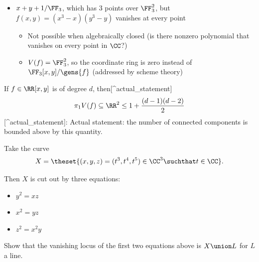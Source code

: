 \begin{example}
\begin{itemize}
\item
  \(x+y+1/\FF_3\), which has 3 points over \(\FF_3^2\), but
  \(f(x, y) = (x^3 - x)(y^3-y)\) vanishes at every point

  \begin{itemize}
  \item
    Not possible when algebraically closed (is there nonzero polynomial
    that vanishes on every point in \(\CC\)?)
  \item
    \(V(f) = \FF_3^2\), so the coordinate ring is zero instead of
    \(\FF_3[x, y]/\gens{f}\) (addressed by scheme theory)
  \end{itemize}
\end{itemize}

\end{example}

\begin{theorem}

If \(f \in \RR[x, y]\) is of degree \(d\),
then{[}\^{}actual\_statement{]}
\begin{align*}  
\pi_1 V(f) \subseteq \RR^2 \leq 1 + {(d-1)(d-2) \over 2}
\end{align*} {[}\^{}actual\_statement{]}: Actual statement: the number
of connected components is bounded above by this quantity.

\end{theorem}

\begin{example}

Take the curve
\begin{align*}  
X = \theset{(x, y, z) = (t^3, t^4, t^5) \in \CC^3 \suchthat t\in \CC}
.\end{align*}

Then \(X\) is cut out by three equations:

\begin{itemize}
\tightlist
\item
  \(y^2 = xz\)
\item
  \(x^2 = yz\)
\item
  \(z^2 = x^2 y\)
\end{itemize}

\end{example}

\begin{exercise}

Show that the vanishing locus of the first two equations above is
\(X\union L\) for \(L\) a line.

\end{exercise}

